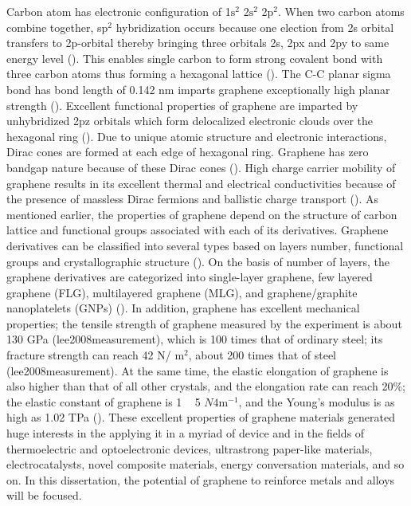 Carbon atom has electronic configuration of 1$\text{s}^{2}$ 2$\text{s}^{2}$ 2$\text{p}^{2}$. When two carbon atoms combine together, s$\text{p}^{2}$ hybridization occurs because one election from 2s orbital transfers to 2p-orbital thereby bringing three orbitals 2s, 2px and 2py to same energy level (\cite{littlejohn2013electrical}). This enables single carbon to form strong covalent bond with three carbon atoms thus forming a hexagonal lattice (\cite{tiwari2016magical}). The C-C planar sigma bond has bond length of 0.142 nm imparts graphene exceptionally high planar strength (\cite{huang2011graphene}). Excellent functional properties of graphene are imparted by unhybridized 2pz orbitals which form delocalized electronic clouds over the hexagonal ring (\cite{agarwal2018carbon}). Due to unique atomic structure and electronic interactions, Dirac cones are formed at each edge of hexagonal ring. Graphene has zero bandgap nature because of these Dirac cones (\cite{abbott2007graphene}). High charge carrier mobility of graphene results in its excellent thermal and electrical conductivities because of the presence of massless Dirac fermions and ballistic charge transport (\cite{bolotin2008ultrahigh}).
As mentioned earlier, the properties of graphene depend on the structure of carbon lattice and functional groups associated with each of its derivatives. Graphene derivatives can be classified into several types based on layers number, functional groups and crystallographic structure (\cite{geim2009nature}). On the basis of number of layers, the graphene derivatives are categorized into single-layer graphene, few layered graphene (FLG), multilayered graphene (MLG), and graphene/graphite nanoplatelets (GNPs) (\cite{kauling2018worldwide}).  In addition, graphene has excellent mechanical properties; the tensile strength of graphene measured by the experiment is about 130 GPa (lee2008measurement), which is 100 times that of ordinary steel; its fracture strength can reach 42 N/ $\text{m}^{2}$, about 200 times that of steel (lee2008measurement). At the same time, the elastic elongation of graphene is also higher than that of all other crystals, and the elongation rate can reach 20\%; the elastic constant of graphene is 1 ~ 5 $N4\text{m}^{-1}$, and the Young's modulus is as high as 1.02 TPa (\cite{lee2008measurement}). These excellent properties of graphene materials generated huge interests in the applying it in a myriad of device and in the fields of thermoelectric and optoelectronic devices, ultrastrong paper-like materials, electrocatalysts, novel composite materials, energy conversation materials, and so on. In this dissertation, the potential of graphene to reinforce metals and alloys will be focused.

